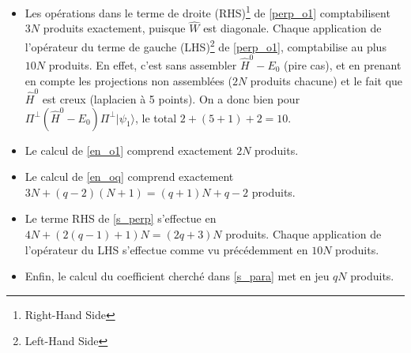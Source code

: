 \documentclass[svgnames,dvipsnames,a4paper,10pt,french]{report}
\begin{document}
\begin{itemize}
    \item Les opérations dans le terme de droite (RHS)\footnote{Right-Hand Side} de \ref{perp_o1} comptabilisent $3N$ produits exactement, puisque $\hat{W}$ est diagonale. Chaque application de l'opérateur du terme de gauche (LHS)\footnote{Left-Hand Side} de \ref{perp_o1}, comptabilise au plus $10N$ produits. En effet, c'est sans assembler $\hat{H}^0-E_0$ (pire cas), et en prenant en compte les projections non assemblées ($2N$ produits chacune) et le fait que $\hat{H}^0$ est creux (laplacien à 5 points). On a donc bien pour $\Pi^\perp (\hat{H}^0-E_0) \Pi^\perp |\psi_1\rangle$, le total $2+(5+1)+2 = 10$.
    
    \item Le calcul de \ref{en_o1} comprend exactement $2N$ produits.
    
    \item Le calcul de \ref{en_oq} comprend exactement $3N+(q-2)(N+1)=(q+1)N+q-2$ produits.
    \item Le terme RHS de \ref{s_perp} s'effectue en $4N+(2(q-1)+1)N=(2q+3)N$ produits. Chaque application de l'opérateur du LHS s'effectue comme vu précédemment en $10N$ produits.
    \item Enfin, le calcul du coefficient cherché dans \ref{s_para} met en jeu  $qN$ produits.
    

\end{itemize}
\end{document}
